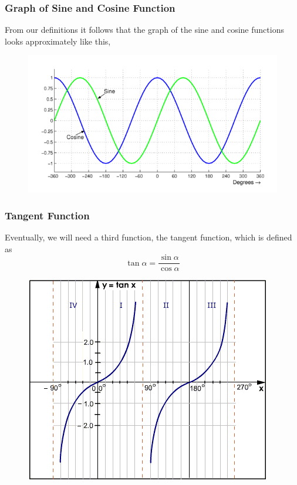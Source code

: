 \documentclass[xcolor=dvipsnames]{beamer}
\begin{document}
\begin{frame}
  \frametitle{Graph of Sine and Cosine Function}
From our definitions it follows that the graph of the sine and cosine
functions looks approximately like this,
  \begin{figure}[h]
    \includegraphics[scale=2]{./sinecosine.png}
  \end{figure}
\end{frame}

\begin{frame}
  \frametitle{Tangent Function}
Eventually, we will need a third function, the tangent function, which
is defined as
\begin{equation}
  \label{eq:bebiefee}
  \tan\alpha=\frac{\sin\alpha}{\cos\alpha}
\end{equation}
  \begin{figure}[h]
    \includegraphics[scale=.5]{./tangent.png}
  \end{figure}
\end{frame}
\end{document}
